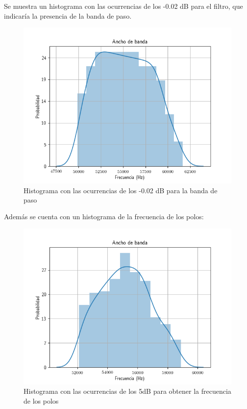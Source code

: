 \documentclass[../../tc_tp5_main.tex]{subfiles}
\begin{document}
 	 Se muestra un histograma con las ocurrencias de los -0.02 dB para el filtro, que indicaría la presencia de la banda de paso.
 	 \begin{figure}[H]	%
	\centering
	\includegraphics[scale=0.5]{imagenes/histograma.png}
	\caption{Histograma con las ocurrencias de los -0.02 dB para la banda de paso}
	\label{fig:ej2_histograma}
	\end{figure}
	Además se cuenta con un histograma de la frecuencia de los polos: 
	 	 \begin{figure}[H]	%
	\centering
	\includegraphics[scale=0.5]{imagenes/polos_histograma.png}
	\caption{Histograma con las ocurrencias de los 5dB para obtener la frecuencia de los polos}
	\label{fig:ej2_polos_histograma}
	\end{figure}
	
\end{document}
